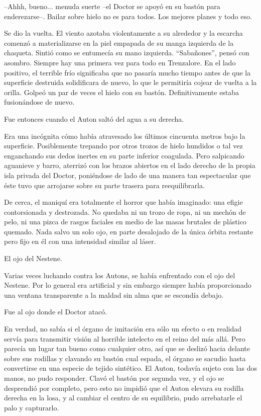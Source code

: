 --Ahhh, bueno... menuda suerte --el Doctor se apoyó en su bastón para enderezarse--. Bailar sobre hielo no es para todos. Los mejores planes y todo eso.
 
Se dio la vuelta. El viento azotaba violentamente a su alrededor y la escarcha comenzó a materializarse en la piel empapada de su manga izquierda de la chaqueta. Sintió como se entumecía su mano izquierda. ``Sabañones'', pensó con asombro. Siempre hay una primera vez para todo en Trenzalore. En el lado positivo, el terrible frío significaba que no pasaría mucho tiempo antes de que la superficie destruida solidificara de nuevo, lo que le permitiría cojear de vuelta a la orilla. Golpeó un par de veces el hielo con su bastón. Definitivamente estaba fusionándose de nuevo.
 
Fue entonces cuando el Auton saltó del agua a su derecha.
 
Era una incógnita cómo había atravesado los últimos cincuenta metros bajo la superficie. Posiblemente trepando por otros trozos de hielo hundidos o tal vez enganchando sus dedos inertes en su parte inferior coagulada. Pero salpicando aguanieve y barro, aterrizó con los brazos abiertos en el lado derecho de la propia isla privada del Doctor, poniéndose de lado de una manera tan espectacular que éste tuvo que arrojarse sobre su parte trasera para reequilibrarla.
 
De cerca, el maniquí era totalmente el horror que había imaginado: una efigie contorsionada y destrozada. No quedaba ni un trozo de ropa, ni un mechón de pelo, ni una pizca de rasgos faciales en medio de las masas brutales de plástico quemado. Nada salvo un solo ojo, en parte desalojado de la única órbita restante pero fijo en él con una intensidad similar al láser.
 
El ojo del Nestene.
 
Varias veces luchando contra los Autons, se había enfrentado con el ojo del Nestene. Por lo general era artificial y sin embargo siempre había proporcionado una ventana transparente a la maldad sin alma que se escondía debajo.
 
Fue al ojo donde el Doctor atacó.
 
En verdad, no sabía si el órgano de imitación era sólo un efecto o en realidad servía para transmitir visión al horrible intelecto en el reino del más allá. Pero parecía un lugar tan bueno como cualquier otro, así que se deslizó hacia delante sobre sus rodillas y clavando su bastón cual espada, el órgano se sacudio hasta convertirse en una especie de tejido sintético. El Auton, todavía sujeto con las dos manos, no pudo responder. Clavó el bastón por segunda vez, y el ojo se desprendió por completo, pero esto no impidió que el Auton elevara su rodilla derecha en la losa, y al cambiar el centro de su equilibrio, pudo arrebatarle el palo y capturarlo.
 
